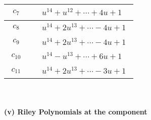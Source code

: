 \documentclass[1p]{elsarticle_modified}
\theoremstyle{definition}
\begin{document}
\begin{tabular}{m{50pt}|m{274pt}}
\hline $$\begin{aligned}c_{7}\end{aligned}$$&$\begin{aligned}
&u^{14}+u^{12}+\cdots+4 u+1
\end{aligned}$\\
\hline $$\begin{aligned}c_{8}\end{aligned}$$&$\begin{aligned}
&u^{14}+2 u^{13}+\cdots-4 u+1
\end{aligned}$\\
\hline $$\begin{aligned}c_{9}\end{aligned}$$&$\begin{aligned}
&u^{14}+2 u^{13}+\cdots-4 u+1
\end{aligned}$\\
\hline $$\begin{aligned}c_{10}\end{aligned}$$&$\begin{aligned}
&u^{14}- u^{13}+\cdots+6 u+1
\end{aligned}$\\
\hline $$\begin{aligned}c_{11}\end{aligned}$$&$\begin{aligned}
&u^{14}+2 u^{13}+\cdots-3 u+1
\end{aligned}$\\
\hline
\end{tabular}\\~\\
\newpage\renewcommand{\arraystretch}{1}
\flushleft \textbf{(v) Riley Polynomials at the component}\newline \\
\end{document}
